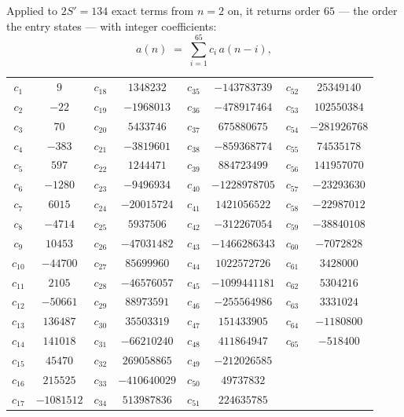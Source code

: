 \documentclass[11pt,a4paper]{article}
\theoremstyle{plain}
\theoremstyle{definition}
\begin{document}
Applied to $2S'=134$ exact terms from $n=2$ on, it returns order $65$ --- the
order the entry states --- with integer coefficients:
\[
a(n)\;=\;\sum_{i=1}^{65}c_i\,a(n-i),
\]
\begin{center}\small
\begin{tabular}{cccccccc}
$c_{1}$ & $9$ & $c_{18}$ & $1348232$ & $c_{35}$ & $-143783739$ & $c_{52}$ & $25349140$ \\
$c_{2}$ & $-22$ & $c_{19}$ & $-1968013$ & $c_{36}$ & $-478917464$ & $c_{53}$ & $102550384$ \\
$c_{3}$ & $70$ & $c_{20}$ & $5433746$ & $c_{37}$ & $675880675$ & $c_{54}$ & $-281926768$ \\
$c_{4}$ & $-383$ & $c_{21}$ & $-3819601$ & $c_{38}$ & $-859368774$ & $c_{55}$ & $74535178$ \\
$c_{5}$ & $597$ & $c_{22}$ & $1244471$ & $c_{39}$ & $884723499$ & $c_{56}$ & $141957070$ \\
$c_{6}$ & $-1280$ & $c_{23}$ & $-9496934$ & $c_{40}$ & $-1228978705$ & $c_{57}$ & $-23293630$ \\
$c_{7}$ & $6015$ & $c_{24}$ & $-20015724$ & $c_{41}$ & $1421056522$ & $c_{58}$ & $-22987012$ \\
$c_{8}$ & $-4714$ & $c_{25}$ & $5937506$ & $c_{42}$ & $-312267054$ & $c_{59}$ & $-38840108$ \\
$c_{9}$ & $10453$ & $c_{26}$ & $-47031482$ & $c_{43}$ & $-1466286343$ & $c_{60}$ & $-7072828$ \\
$c_{10}$ & $-44700$ & $c_{27}$ & $85699960$ & $c_{44}$ & $1022572726$ & $c_{61}$ & $3428000$ \\
$c_{11}$ & $2105$ & $c_{28}$ & $-46576057$ & $c_{45}$ & $-1099441181$ & $c_{62}$ & $5304216$ \\
$c_{12}$ & $-50661$ & $c_{29}$ & $88973591$ & $c_{46}$ & $-255564986$ & $c_{63}$ & $3331024$ \\
$c_{13}$ & $136487$ & $c_{30}$ & $35503319$ & $c_{47}$ & $151433905$ & $c_{64}$ & $-1180800$ \\
$c_{14}$ & $141018$ & $c_{31}$ & $-66210240$ & $c_{48}$ & $411864947$ & $c_{65}$ & $-518400$ \\
$c_{15}$ & $45470$ & $c_{32}$ & $269058865$ & $c_{49}$ & $-212026585$ &  &  \\
$c_{16}$ & $215525$ & $c_{33}$ & $-410640029$ & $c_{50}$ & $49737832$ &  &  \\
$c_{17}$ & $-1081512$ & $c_{34}$ & $513987836$ & $c_{51}$ & $224635785$ &  &  \\
\end{tabular}
\end{center}
\end{document}
